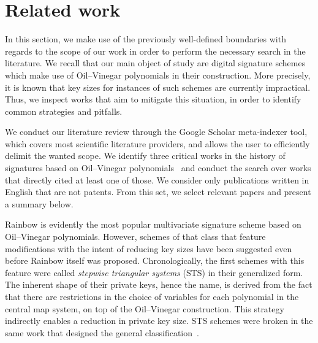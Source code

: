 \documentclass[draft, 12pt, a4paper, oneside]{memoir}
\begin{document}

\section{Related work}\label{sec:related}

In this section, we make use of the previously well-defined boundaries with regards to the scope of our work in order to perform the necessary search in the literature. We recall that our main object of study are digital signature schemes which make use of Oil--Vinegar polynomials in their construction. More precisely, it is known that key sizes for instances of such schemes are currently impractical. Thus, we inspect works that aim to mitigate this situation, in order to identify common strategies and pitfalls.

We conduct our literature review through the Google Scholar meta-indexer tool, which covers most scientific literature providers, and allows the user to efficiently delimit the wanted scope. We identify three critical works in the history of signatures based on Oil--Vinegar polynomials~\cite{Patarin:199709,Kipnis:199904,Ding:200506} and conduct the search over works that directly cited at least one of those. We consider only publications written in English that are not patents. From this set, we select relevant papers and present a summary below.





Rainbow is evidently the most popular multivariate signature scheme based on Oil--Vinegar polynomials. However, schemes of that class that feature modifications with the intent of reducing key sizes have been suggested even before Rainbow itself was proposed. Chronologically, the first schemes with this feature were called \emph{stepwise triangular systems} (STS) in their generalized form. The inherent shape of their private keys, hence the name, is derived from the fact that there are restrictions in the choice of variables for each polynomial in the central map system, on top of the Oil--Vinegar construction. This strategy indirectly enables a reduction in private key size. STS schemes were broken in the same work that designed the general classification~\cite{}.
\end{document}
